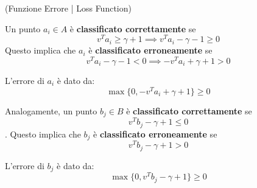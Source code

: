 \begin{definition}
    (Funzione Errore | Loss Function)

    Un punto $a_i \in A$ è \textbf{classificato correttamente} se $$ v^T a_i \geq
        \gamma + 1 \implies v^T a_i - \gamma - 1 \geq 0 $$ Questo implica che $a_i$ è
    \textbf{classificato erroneamente} se $$ v^T a_i - \gamma -1 < 0 \implies -v^T
        a_i + \gamma + 1 > 0 $$

    L'errore di $a_i$ è dato da: $$ \max\{0, -v^T a_i + \gamma + 1\} \geq 0 $$

    Analogamente, un punto $b_j \in B$ è \textbf{classificato correttamente} se $$
        v^T b_j - \gamma + 1 \leq 0 $$. Questo implica che $b_j$ è \textbf{classificato
        erroneamente} se $$ v^T b_j - \gamma + 1 > 0 $$

    L'errore di $b_j$ è dato da: $$ \max\{0, v^T b_j - \gamma + 1\} \geq 0 $$
\end{definition}
